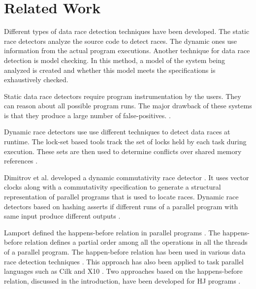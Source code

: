 \section{Related Work} \label{sec:rel-work}

Different types of data race detection techniques have been developed. The static race detectors analyze the source code to detect races. The dynamic ones use information from the actual program executions. Another technique for data race detection is model checking. In this method, a model of the system being analyzed is created and whether this model meets the specifications is exhaustively checked.

Static data race detectors require program instrumentation by the users. They can reason about all possible program runs. The major drawback of these systems is that they produce a large number of false-positives. \cite{engler2003racerx,ESC,abadi2006types,naik2006effective,voung2007relay,choi2001static, vechev2011automatic}. 

Dynamic race detectors use use different techniques to detect data races at runtime. The lock-set based tools track the set of locks held by each task during execution. These sets are then used to determine conflicts over shared memory references \cite{savage1997eraser, EraserUpgrade, elmas2006goldilocks, elmas2007goldilocks}. 

Dimitrov et al. developed a dynamic commutativity race detector \cite{dimitrov2014commutativity}. It uses vector clocks along with a commutativity specification to generate a structural representation of parallel programs that is used to locate races. Dynamic race detectors based on hashing asserts if different runs of a parallel program with same input produce different outputs \cite{nistor2010instantcheck}.

Lamport defined the happens-before relation in parallel programs \cite{lamport1978time}. The happens-before relation defines a partial order among all the operations in all the threads of a parallel program. The happen-before relation has been used in various data race detection techniques \cite{kahlon2009static, kahlon2010universal, flanagan2009fasttrack, mellor1991fly, schonberg1989fly, miller1988mechanism}. This approach has also been applied to task parallel languages such as Cilk and X10 \cite{Feng97efficientdetection, Async-Finish-Race}. Two approaches based on the happens-before relation, discussed in the introduction, have been developed for HJ programs \cite{raman2012scalable, drdForFutures}. 

